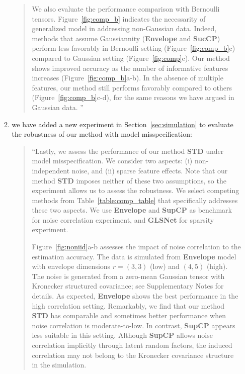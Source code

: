 \documentclass[11pt]{article}
\theoremstyle{plain}
\theoremstyle{definition}
\begin{document}
\begin{enumerate}[wide, labelwidth=!, labelindent=0pt]
\begin{enumerate}[wide, labelwidth=!, labelindent=0pt]
\begin{quote}
We also evaluate the performance comparison with Bernoulli tensors. Figure~\ref{fig:comp_b} indicates the necessarity of generalized model in addressing non-Gaussian data. Indeed, methods that assume Gaussiannity (\textbf{Envelope} and \textbf{SucCP}) perform less favorably in Bernoulli setting (Figure~\ref{fig:comp_b}c) compared to Gaussian setting (Figure~\ref{fig:comp}c). Our method shows improved accuracy as the number of informative features increases (Figure~\ref{fig:comp_b}a-b). In the absence of multiple features, our method still performs favorably compared to others (Figure~\ref{fig:comp_b}c-d), for the same reasons we have argued in Gaussian data. ''
  \end{quote}
        
        \item we have added a new experiment in Section~\ref{sec:simulation} to evaluate the robustness of our method with model misspecification:
        \begin{quote}
            ``Lastly, we assess the performance of our method {\bf STD} under model misspecification. We consider two aspects: (i) non-independent noise, and (ii) sparse feature effects. Note that our method {\bf STD} imposes neither of these two assumptions, so the experiment allows us to assess the robustness. We select competing methods from Table~\ref{table:comp_table} that specifically addresses these two aspects. We use {\bf Envelope} and {\bf SupCP} as benchmark for noise correlation experiment, and {\bf GLSNet} for sparsity experiment.

Figure~\ref{fig:noniid}a-b assesses the impact of noise correlation to the estimation accuracy. The data is simulated from {\bf Envelope} model with envelope dimensions $r=(3,3)$ (low) and $(4,5)$ (high). The noise is generated from a zero-mean Gaussian tensor with Kronecker structured covariance; see Supplementary Notes for details. As expected, {\bf Envelope} shows the best performance in the high correlation setting. Remarkably, we find that our method {\bf STD} has comparable and sometimes better performance when noise correlation is moderate-to-low. In contrast, {\bf SupCP} appears less suitable in this setting. Although {\bf SupCP} allows noise correlation implicitly through latent random factors, the induced correlation may not belong to the Kronecker covariance structure in the simulation. 




\end{quote}
\end{enumerate}
\end{enumerate}
\end{document}
